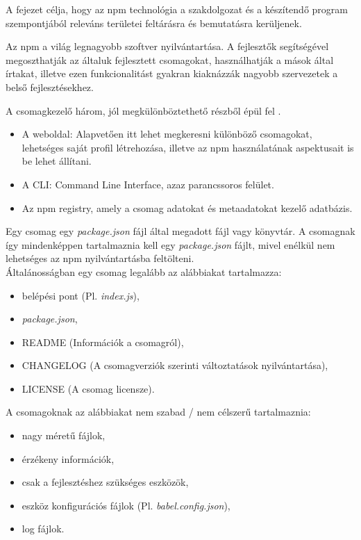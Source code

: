 
A fejezet célja, hogy az npm technológia a szakdolgozat és a készítendő program szempontjából releváns területei feltárásra és bemutatásra kerüljenek.

Az npm a világ legnagyobb szoftver nyilvántartása. A fejlesztők segítségével megoszthatják az általuk fejlesztett csomagokat, használhatják a mások által írtakat, illetve ezen funkcionalitást gyakran kiaknázzák nagyobb szervezetek a belső fejlesztésekhez.

A csomagkezelő három, jól megkülönböztethető részből épül fel \cite{npm-about}.
\begin{itemize}
	\item A weboldal: Alapvetően itt lehet megkeresni különböző csomagokat, lehetséges saját profil létrehozása, illetve az npm használatának aspektusait is be lehet állítani.
	\item A CLI: Command Line Interface, azaz parancssoros felület.
	\item Az npm registry, amely a csomag adatokat és metaadatokat kezelő adatbázis.
\end{itemize}


Egy csomag egy \emph{package.json} fájl által megadott fájl vagy könyvtár. A csomagnak így mindenképpen tartalmaznia kell egy \emph{package.json} fájlt, mivel enélkül nem lehetséges az npm nyilvántartásba feltölteni.\\

Általánosságban egy csomag legalább az alábbiakat tartalmazza: 

\begin{itemize}
	\item belépési pont (Pl. \emph{index.js}),
	\item \emph{package.json},
	\item README (Információk a csomagról),
	\item CHANGELOG (A csomagverziók szerinti változtatások nyilvántartása),
	\item LICENSE (A csomag licensze).
\end{itemize}

\pagebreak

A csomagoknak az alábbiakat nem szabad / nem célszerű tartalmaznia:

\begin{itemize}
	\item nagy méretű fájlok,
	\item érzékeny információk,
	\item csak a fejlesztéshez szükséges eszközök,
	\item eszköz konfigurációs fájlok (Pl. \emph{babel.config.json}),
	\item log fájlok.
\end{itemize}

